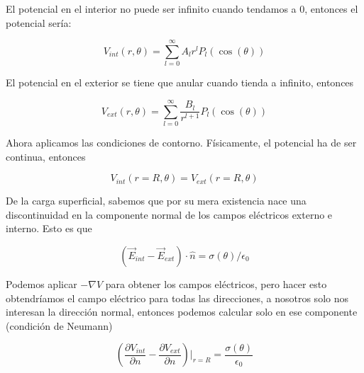 \documentclass[12pt,a4paper]{report}
\newcommand{\esp}{\vspace{0.5cm}}
\begin{document}
	El potencial en el interior no puede ser infinito cuando tendamos a 0, entonces el potencial sería:
	
	\esp
	
	\begin{equation}
		V_{int}(r, \theta) = \sum_{l=0}^\infty A_l r^l P_l(\cos(\theta))
	\end{equation}
	
	\esp
	
	\noindent El potencial en el exterior se tiene que anular cuando tienda a infinito, entonces
	
	\esp
	
	\begin{equation}
		V_{ext}(r, \theta) = \sum_{l=0}^\infty \frac{B_l}{r^{l+1}} P_l(\cos(\theta))
	\end{equation}
	
	\esp

	Ahora aplicamos las condiciones de contorno. Físicamente, el potencial ha de ser continua, entonces
	
	\esp
	
	\begin{equation}
		V_{int}(r = R, \theta) = V_{ext}(r = R, \theta)
	\end{equation}

	\esp
	
	De la carga superficial, sabemos que por su mera existencia nace una discontinuidad en la componente normal de los campos eléctricos externo e interno. Esto es que
	
	\esp
	
	\begin{equation}
		(\vec{E}_{int} - \vec{E}_{ext})\cdot \hat{n} = \sigma(\theta)/\epsilon_0
	\end{equation}
	
	\esp
	
	Podemos aplicar $-\nabla V$ para obtener los campos eléctricos, pero hacer esto obtendríamos el campo eléctrico para todas las direcciones, a nosotros solo nos interesan la dirección normal, entonces podemos calcular solo en ese componente (condición de Neumann)
	
	\esp
	
	\begin{equation}
		\left( \frac{\partial V_{int}}{\partial n} - \frac{\partial V_{ext}}{\partial n} \right) \bigg|_{r=R} = \frac{\sigma(\theta)}{\epsilon_0}
	\end{equation}
	
	\esp
	
\end{document}
